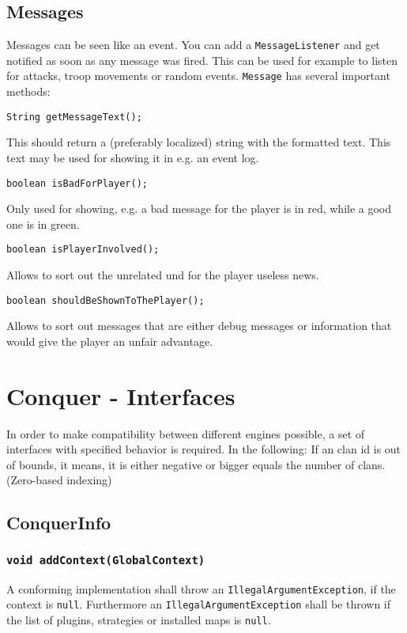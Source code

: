 \documentclass{article}
\begin{document}
\subsection{Messages}
Messages can be seen like an event. You can add a \texttt{MessageListener} and get notified as soon as any message was fired. This can be used for example to listen for attacks, troop movements or random events.
\texttt{Message} has several important methods:
\begin{verbatim}
String getMessageText();
\end{verbatim}
This should return a (preferably localized) string with the formatted text. This text may be used for showing it in e.g. an event log.
\begin{verbatim}
boolean isBadForPlayer();
\end{verbatim}
Only used for showing, e.g. a bad message for the player is in red, while a good one is in green.
\begin{verbatim}
boolean isPlayerInvolved();
\end{verbatim}
Allows to sort out the unrelated und for the player useless news.
\begin{verbatim}
boolean shouldBeShownToThePlayer();
\end{verbatim}
Allows to sort out messages that are either debug messages or information that would give the player an unfair advantage.

\section{Conquer - Interfaces}

In order to make compatibility between different engines possible, a 
set of interfaces with specified behavior is required.
In the following:
If an clan id is out of bounds, it means, it is either negative or
bigger equals the number of clans. (Zero-based indexing)
\subsection{ConquerInfo}

\subsubsection{\texttt{void addContext(GlobalContext)}}
A conforming implementation shall throw an \texttt{IllegalArgumentException}, if the context is \texttt{null}.
Furthermore an \texttt{IllegalArgumentException} shall be thrown if the list
of plugins, strategies or installed maps is \texttt{null}.
\end{document}

